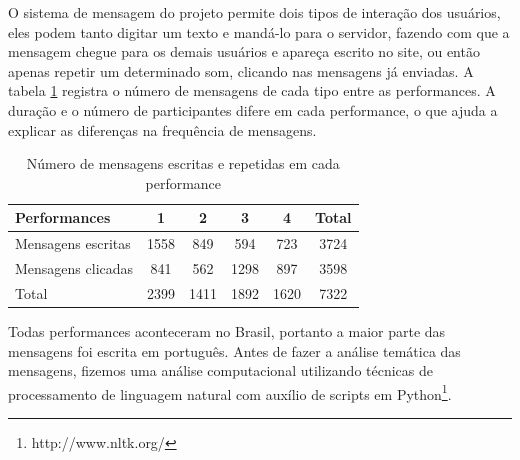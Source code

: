 
O sistema de mensagem do projeto permite dois tipos de interação dos usuários, eles podem tanto digitar um texto e mandá-lo para o servidor, fazendo com que a mensagem chegue para os demais usuários e apareça escrito no site, ou então apenas repetir um determinado som, clicando nas mensagens já enviadas. A tabela \ref{tab:msgtype} registra o número de mensagens de cada tipo entre as performances. A duração e o número de participantes difere em cada performance, o que ajuda a explicar as diferenças na frequência de mensagens.


\begin{table}[ht!]
\caption{Número de mensagens escritas e repetidas em cada performance}{%
\begin{tabular}{@{}lccccc@{}}
\hline
Performances        & 1 & 2 & 3 & 4 & Total \\
\hline
Mensagens escritas &    1558&   849  &  594  &  723 & 3724 \\
Mensagens clicadas &    841 &   562  &  1298 &  897 & 3598 \\
Total &             2399&   1411 &  1892 & 1620 & 7322 \\
\end{tabular}}
\label{tab:msgtype}
\end{table}


Todas performances aconteceram no Brasil, portanto a maior parte das mensagens foi escrita em português. Antes de fazer a análise temática das mensagens, fizemos uma análise computacional utilizando técnicas de processamento de linguagem natural com auxílio de scripts em Python\footnote{http://www.nltk.org/}. 

